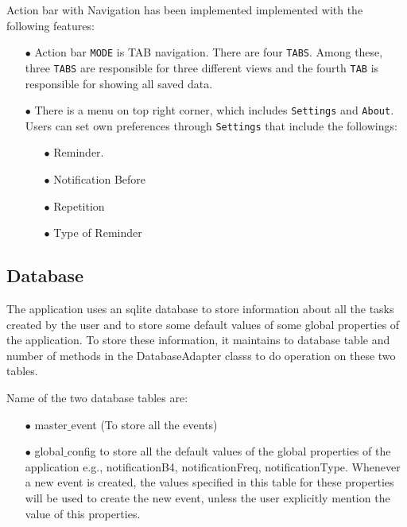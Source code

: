 \documentclass[10pt,a4paper]{report}
\begin{document}
Action bar with Navigation has been implemented implemented with the following features:
\begin{itemize}

 \item[$\bullet$] Action bar \texttt{MODE} is TAB navigation. There are four \texttt{TABS}. Among these, three \texttt{TABS} are responsible for three different views and the fourth \texttt{TAB} is responsible for showing all saved data.
\item[$\bullet$] There is a menu on top right corner, which includes \texttt{Settings} and \texttt{About}. Users can set own preferences through \texttt{Settings} that include the followings:

	\begin{itemize}
	   \item[$\bullet$] Reminder.
	   \item[$\bullet$] Notification Before
	   \item[$\bullet$] Repetition
	   \item[$\bullet$] Type of Reminder
	\end{itemize}

\end{itemize}

\subsection{Database}

The application uses an sqlite database to store information about all the tasks created by the user and to store some default values of some global properties of the application. To store these information, it maintains to database table and number of methods in the DatabaseAdapter classs to do operation on these two tables.

Name of the two database tables are:

	\begin{itemize}
	  \item[$\bullet$]  master$\_$event  (To store all the events)
	  \item[$\bullet$]  global$\_$config to store all the default values of the global properties of the application e.g., notificationB4, notificationFreq, notificationType. Whenever a new event is created, the values specified in this table for these properties will be used to create the new event, unless the user explicitly mention the value of this properties.
	\end{itemize}
	
\end{document}
